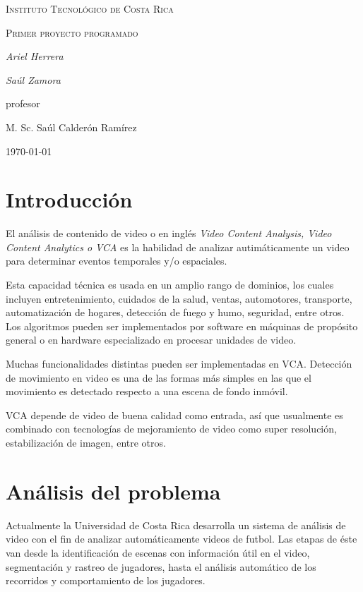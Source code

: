 \documentclass{IEEEtran}
\begin{document}
\begin{titlepage}
  \centering
  {\scshape\LARGE Instituto Tecnol\'ogico de Costa Rica \par}
  \vspace{1cm}
  {\scshape\Large Primer proyecto programado\par}
  \vspace{1.5cm}
  {\Large\itshape Ariel Herrera\par}
  {\Large\itshape Sa\'ul Zamora\par}
  \vfill
  profesor\par
  M. Sc. Sa\'ul Calder\'on Ram\'irez \textsc{}

  \vfill

  {\large \today\par}
\end{titlepage}

\section{Introducci\'on}

El an\'alisis de contenido de video o en ingl\'es \emph{Video Content Analysis, Video Content Analytics o VCA} es la habilidad de analizar autim\'aticamente un video para determinar eventos temporales y/o espaciales.

Esta capacidad t\'ecnica es usada en un amplio rango de dominios, los cuales incluyen entretenimiento, cuidados de la salud, ventas, automotores, transporte, automatizaci\'on de hogares, detecci\'on de fuego y humo, seguridad, entre otros. Los algoritmos pueden ser implementados por software en m\'aquinas de prop\'osito general o en hardware especializado en procesar unidades de video.

Muchas funcionalidades distintas pueden ser implementadas en VCA. Detecci\'on de movimiento en video es una de las formas m\'as simples en las que el movimiento es detectado respecto a una escena de fondo inm\'ovil.

VCA depende de video de buena calidad como entrada, as\'i que usualmente es combinado con tecnolog\'ias de mejoramiento de video como super resoluci\'on, estabilizaci\'on de imagen, entre otros.

\section{An\'alisis del problema}

Actualmente la Universidad de Costa Rica desarrolla un sistema de an\'alisis de video con el fin de analizar autom\'aticamente videos de futbol. Las etapas de \'este van desde la identificaci\'on de escenas con informaci\'on \'util en el video, segmentaci\'on y rastreo de jugadores, hasta el an\'alisis autom\'atico de los recorridos y comportamiento de los jugadores.
\end{document}
